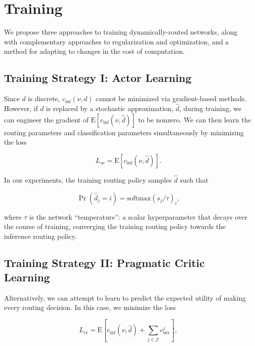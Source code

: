 \documentclass{article}
\begin{document}
  \section{Training}

  We propose three approaches to training dynamically-routed networks, along with complementary approaches to regularization and optimization, and a method for adapting to changes in the cost of computation.

  \subsection{Training Strategy I: Actor Learning}
  \label{subesc:actor-learning}
  
  Since $d$ is discrete, $c_\text{inf}(\nu,d)$ cannot be minimized via gradient-based methods. However, if $d$ is replaced by a stochastic approximation, $\hat{d}$, during training, we can engineer the gradient of $\mathrm{E}[c_\text{inf}(\nu,\hat{d})]$ to be nonzero. We can then learn the routing parameters and classification parameters simultaneously by minimizing the loss
  
  \begin{equation}
    L_\text{ac} = \mathrm{E}[c_\text{inf}(\nu,\hat{d})].
  \end{equation}

  In our experiments, the training routing policy samples $\hat{d}$ such that
  
  \begin{equation}
    \Pr(\hat{d}_j=i) = \text{softmax}(s_j/\tau)_i,
  \end{equation}

  where $\tau$ is the network ``temperature'': a scalar hyperparameter that decays over the course of training, converging the training routing policy towards the inference routing policy.
  
  \subsection{Training Strategy II: Pragmatic Critic Learning}
  \label{subsec:pragmatic-critic-learning}

  Alternatively, we can attempt to learn to predict the expected utility of making every routing decision. In this case, we minimize the loss

  \begin{equation}
    L_\text{cr} = \mathrm{E} \left[
    c_\text{inf}(\nu,\hat{d}) + \sum_{j\in\mathcal{J}} c_\text{ure}^j \right],
  \end{equation}
  
\end{document}
